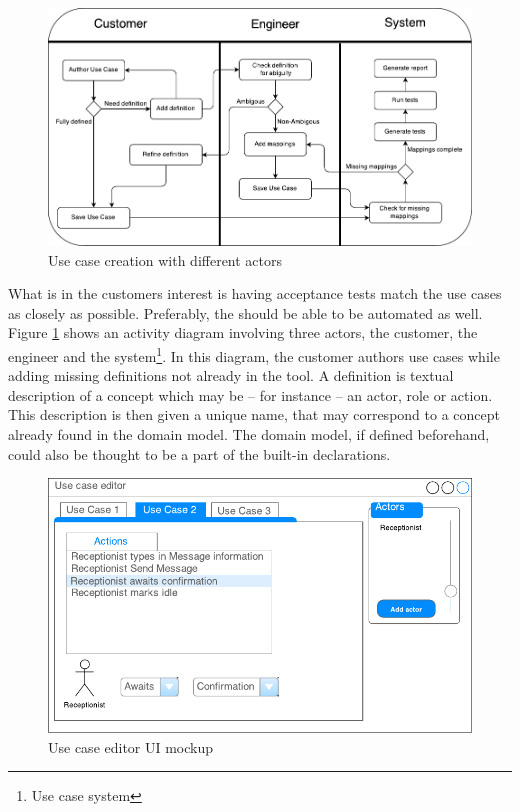 \begin{figure}[h]
\includegraphics[scale=0.75]{img/use_case_creation_activity_diagram}
\centering
\caption{Use case creation with different actors}
\label{fig:use_case_creation_activity_diagram}
\end{figure}

What is in the customers interest is having acceptance tests match the use cases as closely as possible. Preferably, the should be able to be automated as well. Figure \ref{fig:use_case_creation_activity_diagram} shows an activity diagram involving three actors, the customer, the engineer and the system\footnote{Use case system}. In this diagram, the customer authors use cases while adding missing definitions not already in the tool. A definition is textual description of a concept which may be -- for instance -- an actor, role or action. This description is then given a unique name, that may correspond to a concept already found in the domain model. The domain model, if defined beforehand, could also be thought to be a part of the built-in declarations.

\begin{figure}[h]
\includegraphics[scale=0.9]{img/test_case_ui}
\centering
\caption{Use case editor UI mockup}
\label{fig:use_case_editor_mockup}
\end{figure}

